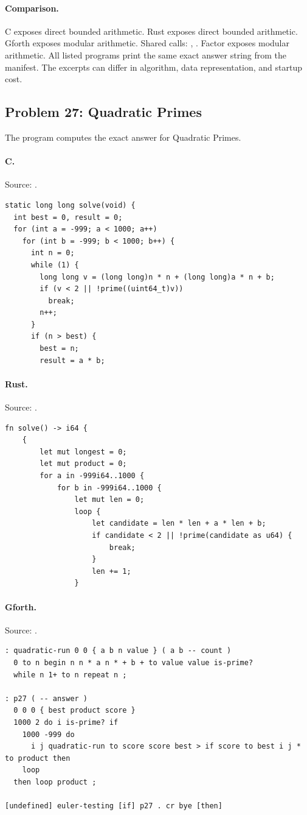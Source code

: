 \paragraph{Comparison.}
C exposes direct bounded arithmetic. Rust exposes direct bounded arithmetic. Gforth exposes modular arithmetic. Shared calls: \texttt{}, \texttt{}. Factor exposes modular arithmetic.
All listed programs print the same exact answer string from the manifest. The excerpts can differ in algorithm, data representation, and startup cost.

\subsection{Problem 27: Quadratic Primes}
\label{walkthrough:p27}
The program computes the exact answer for Quadratic Primes.

\paragraph{C.} Source: .
\begin{lstlisting}
static long long solve(void) {
  int best = 0, result = 0;
  for (int a = -999; a < 1000; a++)
    for (int b = -999; b < 1000; b++) {
      int n = 0;
      while (1) {
        long long v = (long long)n * n + (long long)a * n + b;
        if (v < 2 || !prime((uint64_t)v))
          break;
        n++;
      }
      if (n > best) {
        best = n;
        result = a * b;
\end{lstlisting}

\paragraph{Rust.} Source: .
\begin{lstlisting}
fn solve() -> i64 {
    {
        let mut longest = 0;
        let mut product = 0;
        for a in -999i64..1000 {
            for b in -999i64..1000 {
                let mut len = 0;
                loop {
                    let candidate = len * len + a * len + b;
                    if candidate < 2 || !prime(candidate as u64) {
                        break;
                    }
                    len += 1;
                }
\end{lstlisting}

\paragraph{Gforth.} Source: .
\begin{lstlisting}
: quadratic-run 0 0 { a b n value } ( a b -- count )
  0 to n begin n n * a n * + b + to value value is-prime?
  while n 1+ to n repeat n ;

: p27 ( -- answer )
  0 0 0 { best product score }
  1000 2 do i is-prime? if
    1000 -999 do
      i j quadratic-run to score score best > if score to best i j * to product then
    loop
  then loop product ;

[undefined] euler-testing [if] p27 . cr bye [then]
\end{lstlisting}

